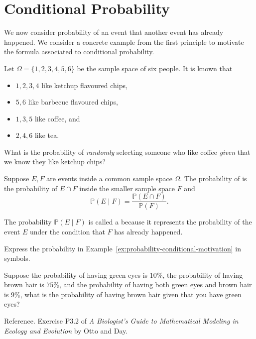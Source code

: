 \documentclass[../main.tex]{subfiles}
\begin{document}
 \section{Conditional Probability}

We now consider probability of an event  that another event has already happened.   We consider a concrete example from the first principle to motivate the formula associated to conditional probability.

\begin{example} \label{ex:probability-conditional-motivation}
  Let \(\Omega = \{1,2,3,4,5,6\}\) be the sample space of six people.  It is known that 
  \begin{itemize}
    \item \(1,2,3,4\) like ketchup flavoured chips,
    \item \(5,6\) like barbecue flavoured chips,
    \item \(1,3,5\) like coffee, and
    \item \(2,4,6\) like tea.
  \end{itemize}

  What is the probability of \emph{randomly} selecting someone who like coffee \emph{given} that we know they like ketchup chips?

\end{example}

\begin{definition}
  Suppose \(E,F\) are events inside a common sample space \(\Omega\).  The probability of  is the probability of \(E \cap F\) inside the smaller sample space \(F\) and
  \[
    \mathbb{P}( E \mid F ) = \frac{\mathbb{P}(E \cap F)}{\mathbb{P}(F)}.
  \]

  The probability \(\mathbb{P}( E \mid F )\) is called a  because it represents the probability of the event \(E\) under the condition that \(F\) has already happened.
\end{definition}

\begin{example}
  Express the probability in Example~\ref{ex:probability-conditional-motivation} in symbols.
\end{example}
\clearpage


\begin{example}
  Suppose the probability of having green eyes is \(10\%\), the probability of having brown hair is \(75\%\), and the probability of having both green eyes and brown hair is \(9\%\), what is the probability of having brown hair given that you have green eyes?
  
  {\footnotesize Reference. Exercise P3.2 of \emph{A Biologist's Guide to Mathematical Modeling in Ecology and Evolution} by Otto and Day.}

\end{example}
\end{document}

